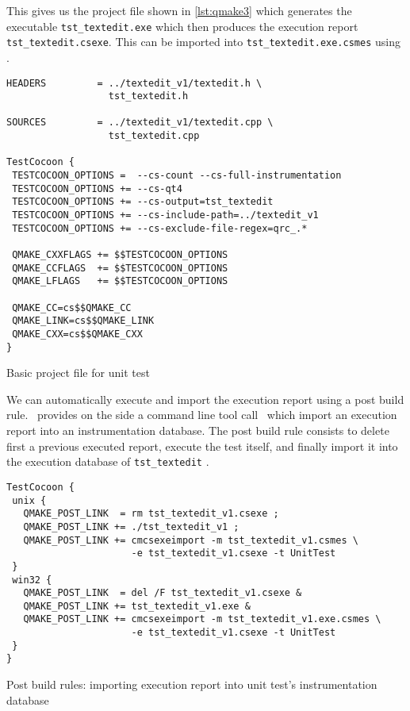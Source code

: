 This gives us the {\qmake} project file shown in \ref{lst:qmake3} which generates
the executable \texttt{tst\_textedit.exe} which then produces the execution report
\texttt{tst\_textedit.csexe}. This can be imported into \texttt{tst\_textedit.exe.csmes}
using \CoverageBrowser.

\begin{figureenv}
  \scriptsize
\begin{verbatim}
HEADERS         = ../textedit_v1/textedit.h \
                  tst_textedit.h

SOURCES         = ../textedit_v1/textedit.cpp \
                  tst_textedit.cpp

TestCocoon {
 TESTCOCOON_OPTIONS =  --cs-count --cs-full-instrumentation
 TESTCOCOON_OPTIONS += --cs-qt4
 TESTCOCOON_OPTIONS += --cs-output=tst_textedit
 TESTCOCOON_OPTIONS += --cs-include-path=../textedit_v1
 TESTCOCOON_OPTIONS += --cs-exclude-file-regex=qrc_.*

 QMAKE_CXXFLAGS += $$TESTCOCOON_OPTIONS
 QMAKE_CCFLAGS  += $$TESTCOCOON_OPTIONS
 QMAKE_LFLAGS   += $$TESTCOCOON_OPTIONS

 QMAKE_CC=cs$$QMAKE_CC
 QMAKE_LINK=cs$$QMAKE_LINK
 QMAKE_CXX=cs$$QMAKE_CXX
}

\end{verbatim}
\caption{Basic {\qmake} project file for unit test}
\label{lst:qmake3}
\end{figureenv}

We can automatically execute and import the execution report using a post build
rule. \TestCocoon\ provides on the side a command line tool call \cmcsexeimport\
which import an execution report into an instrumentation database.
The post build rule consists to delete first a previous executed report,
execute the test itself, and finally import it into the execution database of
\verb$tst_textedit$ \seelstref{lst:qmake4}.


\begin{figureenv}
  \scriptsize
\begin{verbatim}
TestCocoon {
 unix {
   QMAKE_POST_LINK  = rm tst_textedit_v1.csexe ;
   QMAKE_POST_LINK += ./tst_textedit_v1 ;
   QMAKE_POST_LINK += cmcsexeimport -m tst_textedit_v1.csmes \
                      -e tst_textedit_v1.csexe -t UnitTest
 }
 win32 {
   QMAKE_POST_LINK  = del /F tst_textedit_v1.csexe &
   QMAKE_POST_LINK += tst_textedit_v1.exe &
   QMAKE_POST_LINK += cmcsexeimport -m tst_textedit_v1.exe.csmes \
                      -e tst_textedit_v1.csexe -t UnitTest
 }
}
\end{verbatim}
\caption{Post build rules: importing execution report into unit test's instrumentation database}
\label{lst:qmake4}
\end{figureenv}

